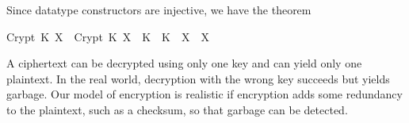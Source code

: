 \begin{isabellebody}
\begin{isamarkuptext}
Since datatype constructors are injective, we have the theorem
\begin{isabelle}%
Crypt\ K\ X\ {}\ Crypt\ K{}\ X{}\ {}\ K\ {}\ K{}\ {}\ X\ {}\ X{}%
\end{isabelle}
A ciphertext can be decrypted using only one key and
can yield only one plaintext.  In the real world, decryption with the
wrong key succeeds but yields garbage.  Our model of encryption is
realistic if encryption adds some redundancy to the plaintext, such as a
checksum, so that garbage can be detected.%
\end{isamarkuptext}%
\isamarkuptrue%
%
\isadelimproof
%
\endisadelimproof
%
\isatagproof
%
\endisatagproof
{\isafoldproof}%
%
\isadelimproof
%
\endisadelimproof
%
\isadelimproof
%
\endisadelimproof
%
\isatagproof
%
\endisatagproof
{\isafoldproof}%
%
\isadelimproof
%
\endisadelimproof
%
\isadelimproof
%
\endisadelimproof
%
\isatagproof
%
\endisatagproof
{\isafoldproof}%
%
\isadelimproof
%
\endisadelimproof
%
\isadelimproof
%
\endisadelimproof
%
\isatagproof
%
\endisatagproof
{\isafoldproof}%
%
\isadelimproof
%
\endisadelimproof
%
\isadelimproof
%
\endisadelimproof
%
\isatagproof
%
\endisatagproof
{\isafoldproof}%
%
\isadelimproof
%
\endisadelimproof
%
\isadelimproof
%
\endisadelimproof
%
\isatagproof
%
\endisatagproof
{\isafoldproof}%
%
\isadelimproof
%
\endisadelimproof
%
\isadelimproof
%
\endisadelimproof
%
\isatagproof
%
\endisatagproof
{\isafoldproof}%
%
\isadelimproof
%
\endisadelimproof
%
\isadelimproof
%
\endisadelimproof
%
\isatagproof
%
\endisatagproof
{\isafoldproof}%
%
\isadelimproof
%
\endisadelimproof
%
\isadelimproof
%
\endisadelimproof
%
\isatagproof
%
\endisatagproof
{\isafoldproof}%
%
\isadelimproof
%
\endisadelimproof
%
\isadelimproof
%
\endisadelimproof
%
\isatagproof
%
\endisatagproof
{\isafoldproof}%
%
\isadelimproof
%
\endisadelimproof
%
\isadelimproof
%
\endisadelimproof
%
\isatagproof
%
\endisatagproof
{\isafoldproof}%
%
\isadelimproof
%
\endisadelimproof
%
\isadelimproof
%
\endisadelimproof
%
\isatagproof
%
\endisatagproof
{\isafoldproof}%
%
\isadelimproof
%
\endisadelimproof
%
\isadelimproof
%
\endisadelimproof
%
\isatagproof
%
\endisatagproof
{\isafoldproof}%
%
\isadelimproof
%
\endisadelimproof
%
\isadelimproof
%
\endisadelimproof
%
\isatagproof

\end{isabellebody}

